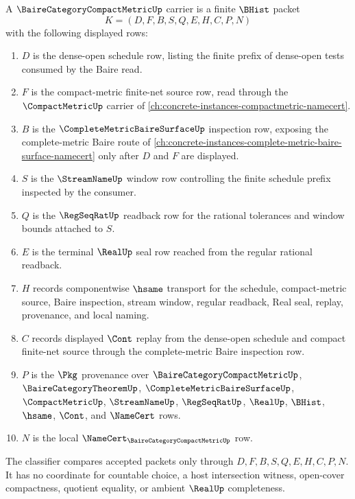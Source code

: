 \begin{definition}
\label{def:baire-category-compact-metric-carrier}
A $\BaireCategoryCompactMetricUp$ carrier is a finite $\BHist$ packet
$$
K=(D,F,B,S,Q,E,H,C,P,N)
$$
with the following displayed rows:
\begin{enumerate}
\item $D$ is the dense-open schedule row, listing the finite prefix of dense-open tests consumed by the Baire read.
\item $F$ is the compact-metric finite-net source row, read through the $\CompactMetricUp$ carrier of \autoref{ch:concrete-instances-compactmetric-namecert}.
\item $B$ is the $\CompleteMetricBaireSurfaceUp$ inspection row, exposing the complete-metric Baire route of \autoref{ch:concrete-instances-complete-metric-baire-surface-namecert} only after $D$ and $F$ are displayed.
\item $S$ is the $\StreamNameUp$ window row controlling the finite schedule prefix inspected by the consumer.
\item $Q$ is the $\RegSeqRatUp$ readback row for the rational tolerances and window bounds attached to $S$.
\item $E$ is the terminal $\RealUp$ seal row reached from the regular rational readback.
\item $H$ records componentwise $\hsame$ transport for the schedule, compact-metric source, Baire inspection, stream window, regular readback, Real seal, replay, provenance, and local naming.
\item $C$ records displayed $\Cont$ replay from the dense-open schedule and compact finite-net source through the complete-metric Baire inspection row.
\item $P$ is the $\Pkg$ provenance over $\BaireCategoryCompactMetricUp$, $\BaireCategoryTheoremUp$, $\CompleteMetricBaireSurfaceUp$, $\CompactMetricUp$, $\StreamNameUp$, $\RegSeqRatUp$, $\RealUp$, $\BHist$, $\hsame$, $\Cont$, and $\NameCert$ rows.
\item $N$ is the local $\NameCert_{\BaireCategoryCompactMetricUp}$ row.
\end{enumerate}
The classifier compares accepted packets only through $D,F,B,S,Q,E,H,C,P,N$. It has no coordinate for countable choice, a host intersection witness, open-cover compactness, quotient equality, or ambient $\RealUp$ completeness.
\end{definition}

